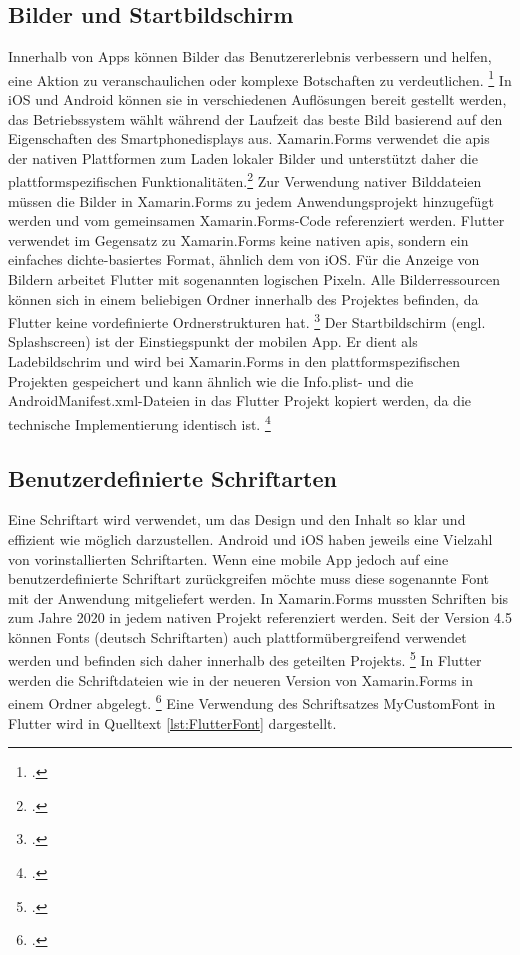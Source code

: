 \subsection{Bilder und Startbildschirm}
Innerhalb von Apps können Bilder das Benutzererlebnis verbessern und helfen,  eine Aktion zu veranschaulichen oder komplexe Botschaften zu verdeutlichen.  \footcite[Vgl.][Abgerufen am \today]{GoogleMaterialImages2020} In iOS und Android können sie in verschiedenen Auflösungen bereit gestellt werden,  das Betriebssystem wählt während der Laufzeit das beste Bild basierend auf den Eigenschaften des Smartphonedisplays aus.  Xamarin.Forms verwendet die \acfp{api} der nativen Plattformen zum Laden lokaler Bilder und unterstützt daher die plattformspezifischen Funktionalitäten.\footcite[Vgl.][Abgerufen am \today]{MicrosoftXamImages2020} Zur Verwendung nativer Bilddateien müssen die Bilder in Xamarin.Forms zu jedem Anwendungsprojekt hinzugefügt werden und vom gemeinsamen Xamarin.Forms-Code referenziert werden.  Flutter verwendet im Gegensatz zu Xamarin.Forms keine nativen \acp{api},  sondern ein einfaches dichte-basiertes Format,  ähnlich dem von iOS.  Für die Anzeige von Bildern arbeitet Flutter mit sogenannten logischen Pixeln.  Alle Bilderressourcen können sich in einem beliebigen Ordner innerhalb des Projektes befinden, da Flutter keine vordefinierte Ordnerstrukturen hat. \footcite[Vgl.][Abgerufen am \today]{GoogleFlutterImages2020} Der Startbildschirm (engl. Splashscreen) ist der Einstiegspunkt der mobilen App.  Er dient als Ladebildschrim und wird bei Xamarin.Forms in den plattformspezifischen Projekten gespeichert und kann ähnlich wie die \glq Info.plist\grq{}- und die \glq AndroidManifest.xml\grq{}-Dateien in das Flutter Projekt kopiert werden,  da die technische Implementierung identisch ist. \footcite[Vgl.][Abgerufen am \today]{GoogleSplash2020} 


\subsection{Benutzerdefinierte Schriftarten}
Eine Schriftart wird verwendet, um das Design und den Inhalt so klar und effizient wie möglich darzustellen.  Android und iOS haben jeweils  eine Vielzahl von vorinstallierten Schriftarten.  Wenn eine mobile App jedoch auf eine benutzerdefinierte Schriftart zurückgreifen möchte muss diese sogenannte Font mit der Anwendung mitgeliefert werden.  In Xamarin.Forms mussten Schriften bis zum Jahre 2020 in jedem nativen Projekt referenziert werden.  Seit der Version 4.5 können Fonts (deutsch Schriftarten) auch plattformübergreifend verwendet werden und befinden sich daher innerhalb des geteilten Projekts. \footcite[Vgl.][Abgerufen am \today]{Versluis2020}  In Flutter werden die Schriftdateien wie in der neueren Version von Xamarin.Forms in einem Ordner abgelegt. \footcite[Vgl.][Abgerufen am \today]{GoogleFlutterFonts2020}  Eine Verwendung des Schriftsatzes \glq MyCustomFont\grq{} in Flutter wird in Quelltext \ref{lst:FlutterFont} dargestellt.  

